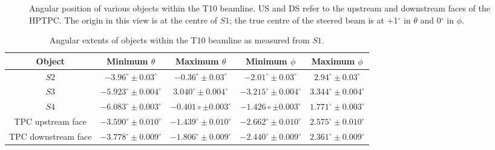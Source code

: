 \begin{figure}[ht]
  \begin{adjustbox}{max totalsize={0.7\textwidth}{.5\textheight},center}
    
  \end{adjustbox}
  \caption{Angular position of various objects within the T10 beamline. US and DS refer to the upstream and downstream faces of the HPTPC. The origin in this view is at the centre of $\mathit{S1}$; the true centre of the steered beam is at +1$^{\circ}$ in $\theta$ and 0$^{\circ}$ in $\phi$.}
  \label{fig:angularDistS1}
\end{figure}

\begin{table}
  \centering
  \caption{Angular extents of objects within the T10 beamline as measured from $\mathit{S1}$.}
  \begin{tabular}{|c|c c c c|}
    \hline
    \hline
    Object & Minimum $\theta$ & Maximum $\theta$ & Minimum $\phi$ & Maximum $\phi$ \\
    \hline
    $\mathit{S2}$ & $-3.96^{\circ} \pm 0.03^{\circ}$ & $-0.36^{\circ} \pm 0.03^{\circ}$ & $-2.01^{\circ} \pm 0.03^{\circ}$ & $2.94^{\circ} \pm 0.03^{\circ}$ \\
    $\mathit{S3}$ & $-5.923^{\circ} \pm 0.004^{\circ}$ & \hspace{6pt} $3.040^{\circ} \pm 0.004^{\circ}$ & $-3.215^{\circ} \pm 0.004^{\circ}$ & $3.344^{\circ} \pm 0.004^{\circ}$ \\
   $\mathit{S4}$ & $-6.083^{\circ} \pm 0.003^{\circ}$ & $-0.401{\circ} \pm 0.003^{\circ}$ & $-1.426{\circ} \pm 0.003^{\circ}$ & $1.771^{\circ} \pm 0.003^{\circ}$ \\
    TPC upstream face & $-3.590^{\circ} \pm 0.010^{\circ}$ & $-1.439^{\circ} \pm 0.010^{\circ}$ & $-2.662^{\circ} \pm 0.010^{\circ}$ & $2.575^{\circ} \pm 0.010^{\circ}$ \\
    TPC downstream face & $-3.778^{\circ} \pm 0.009^{\circ}$ & $-1.806^{\circ} \pm 0.009^{\circ}$ & $-2.440^{\circ} \pm 0.009^{\circ}$ & $2.361^{\circ} \pm 0.009^{\circ}$ \\
    \hline
  \end{tabular}
  \label{tab:angS1}
\end{table}

